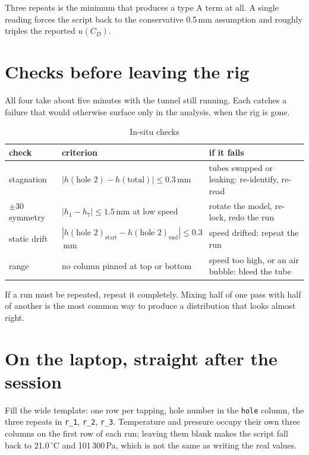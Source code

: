 \documentclass[11pt,a4paper]{article}
\newcommand{\CD}{\ensuremath{C_D}}
\begin{document}
Three repeats is the minimum that produces a type A term at all. A single reading forces the script
back to the conservative 0.5\,mm assumption and roughly triples the reported $u(\CD)$.

\section{Checks before leaving the rig}

All four take about five minutes with the tunnel still running. Each catches a failure that would
otherwise surface only in the analysis, when the rig is gone.

\begin{table}[H]
\centering
\caption{In-situ checks}
\small
\begin{tabularx}{\textwidth}{@{}p{3.6cm} X p{6.2cm}@{}}
\toprule
check & criterion & if it fails \\
\midrule
stagnation & $|h(\text{hole 2}) - h(\text{total})| \leq 0.3$\,mm & tubes swapped or leaking: re-identify, re-read \\
$\pm30$ symmetry & $|h_1 - h_7| \leq 1.5$\,mm at low speed & rotate the model, re-lock, redo the run \\
static drift & $|h(\text{hole 2})_{\text{start}} - h(\text{hole 2})_{\text{end}}| \leq 0.3$\,mm &
speed drifted: repeat the run \\
range & no column pinned at top or bottom & speed too high, or an air bubble: bleed the tube \\
\bottomrule
\end{tabularx}
\end{table}

If a run must be repeated, repeat it completely. Mixing half of one pass with half of another is the
most common way to produce a distribution that looks almost right.

\section{On the laptop, straight after the session}

Fill the wide template: one row per tapping, hole number in the \texttt{hole} column, the three
repeats in \texttt{r\_1}, \texttt{r\_2}, \texttt{r\_3}. Temperature and pressure occupy their own
three columns on the first row of each run; leaving them blank makes the script fall back to
21.0\,$^\circ$C and 101\,300\,Pa, which is not the same as writing the real values.
\end{document}
